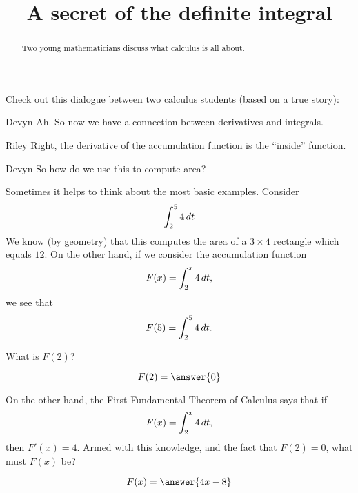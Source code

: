 \documentclass{ximera}
\title[Break-Ground:]{A secret of the definite integral}
\begin{document}
\begin{abstract}
Two young mathematicians discuss what calculus is all about.
\end{abstract}
\maketitle


Check out this dialogue between two calculus students (based on a true
story):

\begin{dialogue}
\item[Devyn] Ah. So now we have a connection between derivatives and
  integrals.
\item[Riley] Right, the derivative of the accumulation function is the
  ``inside'' function.
\item[Devyn] So how do we use this to compute area?
\end{dialogue}

Sometimes it helps to think about the most basic examples. Consider
\[
\int_2^5 4 \mathop{}\!d t
\]
We know (by geometry) that this computes the area of a $3\times 4$
rectangle which equals $12$. On the other hand, if we consider the
accumulation function
\[
F(x) = \int_2^x 4 \mathop{}\!d t,
\]
we see that
\[
F(5) = \int_2^5 4 \mathop{}\!d t.
\]
\begin{problem}
  What is $F(2)$?
  \begin{prompt}
    \[
    F(2) = \answer{0}
    \]
  \end{prompt}
\end{problem}

\begin{problem}
  On the other hand, the First Fundamental Theorem of Calculus says that if
  \[
  F(x) = \int_2^x 4 \mathop{}\!d t,
  \]
  then $F'(x) = 4$. Armed with this knowledge, and the fact that $F(2)
  = 0$, what must $F(x)$ be?
  \begin{prompt}
    \[
    F(x) = \answer{4x-8}
    \]
  \end{prompt}
\end{problem}





%
\end{document}
